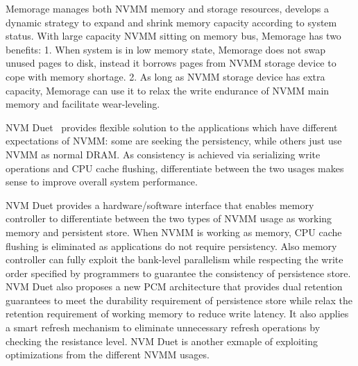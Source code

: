 Memorage manages both NVMM memory and storage resources, develops a dynamic
strategy to expand and shrink memory capacity according to system status. 
With large capacity NVMM sitting on memory bus, Memorage has two benefits:
1. When system is in low memory state, Memorage does not swap unused pages
to disk, instead it borrows pages from NVMM storage device to cope with
memory shortage.
2. As long as NVMM storage device has extra capacity, Memorage can use it
to relax the write endurance of NVMM main memory and facilitate wear-leveling.

NVM Duet~\cite{duet} provides flexible solution to the applications which
have different expectations of NVMM: some are seeking the persistency, while
others just use NVMM as normal DRAM. As consistency is achieved via serializing
write operations and CPU cache flushing, differentiate between the two usages
makes sense to improve overall system performance.

NVM Duet provides a hardware/software interface that enables memory controller
to differentiate between the two types of NVMM usage as working memory and
persistent store. When NVMM is working as memory, CPU cache flushing is
eliminated as applications do not require persistency. Also memory controller
can fully exploit the bank-level parallelism while respecting the write order 
specified by programmers to guarantee the consistency of persistence store.
NVM Duet also proposes a new PCM architecture that provides dual retention
guarantees to meet the durability requirement of persistence store while relax
the retention requirement of working memory to reduce write latency. It also
applies a smart refresh mechanism to eliminate unnecessary refresh operations
by checking the resistance level. NVM Duet is another exmaple of exploiting
optimizations from the different NVMM usages.
